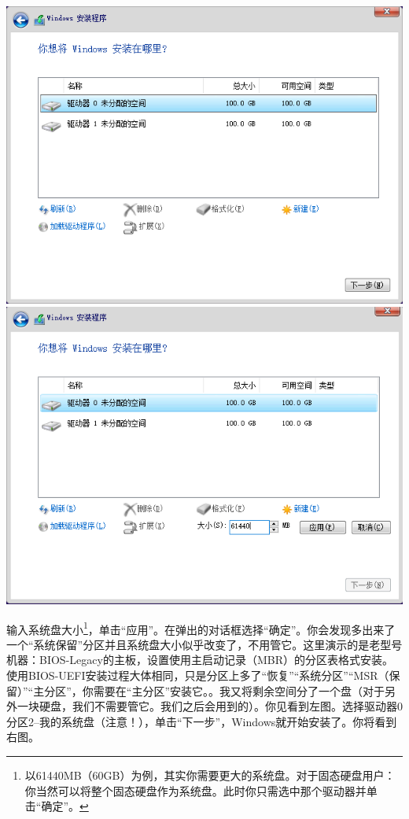 \begin{center}
	\includegraphics[scale=0.5]{pic/win10setup4}\\	\includegraphics[scale=0.5]{pic/win10setup5}
\end{center} \par
输入系统盘大小\footnote{以61440MB（60GB）为例，其实你需要更大的系统盘。对于固态硬盘用户：你当然可以将整个固态硬盘作为系统盘。此时你只需选中那个驱动器并单击“确定”。}，单击“应用”。在弹出的对话框选择“确定”。你会发现多出来了一个“系统保留”分区并且系统盘大小似乎改变了，不用管它。{\color{red}这里演示的是老型号机器：BIOS-Legacy的主板，设置使用主启动记录（MBR）的分区表格式安装。使用BIOS-UEFI安装过程大体相同，只是分区上多了“恢复”“系统分区”“MSR（保留）”“主分区”，你需要在“主分区”安装它。}。我又将剩余空间分了一个盘（对于另外一块硬盘，我们不需要管它。我们之后会用到的）。你见看到左图。选择驱动器0分区2--我的系统盘{\color{red}（注意！）}，单击“下一步”，Windows就开始安装了。你将看到右图。
